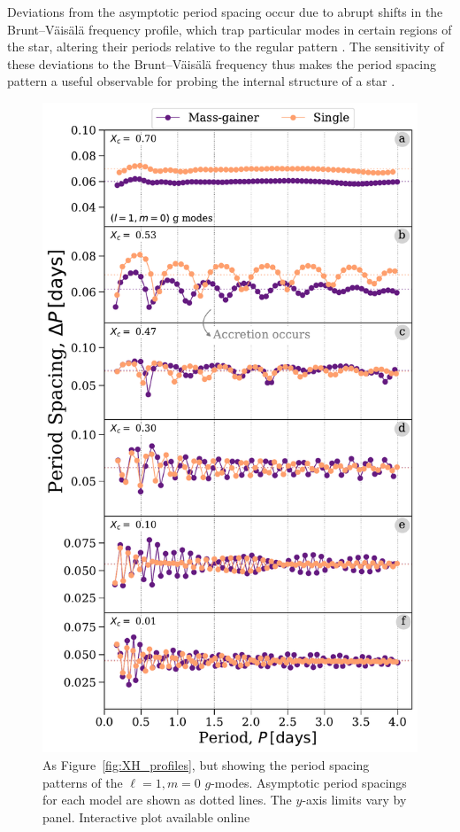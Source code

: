 \documentclass[twocolumn, twocolappendix, oneside]{aastex631}
\newcommand{\bvf}{Brunt–Väisälä frequency\xspace}
\newcommand{\gmodes}{$g$-modes\xspace}
\begin{document}
Deviations from the asymptotic period spacing occur due to abrupt shifts in the \bvf profile, which trap particular modes in certain regions of the star, altering their periods relative to the regular pattern \citep[e.g.][]{Dziembowski1993,Miglio+2008}. The sensitivity of these deviations to the \bvf thus makes the period spacing pattern a useful observable for probing the internal structure of a star \citep[e.g.][]{Aerts+2010}.

\begin{figure}%
    \centering
    \includegraphics[width=\columnwidth]{figures/period_spacing_mdm20.pdf}
    \caption{As Figure~\ref{fig:XH_profiles}, but showing the period spacing patterns of the $\ell = 1, m = 0$ \gmodes. Asymptotic period spacings for each model are shown as dotted lines. The $y$-axis limits vary by panel. Interactive plot available online \href{www.tomwagg.com/html/interact/mass-gainer-asteroseismology.html\#fig5}{{\color{SeaGreen}\faChartArea}}}
    \label{fig:period_spacing}
\end{figure}
\end{document}
